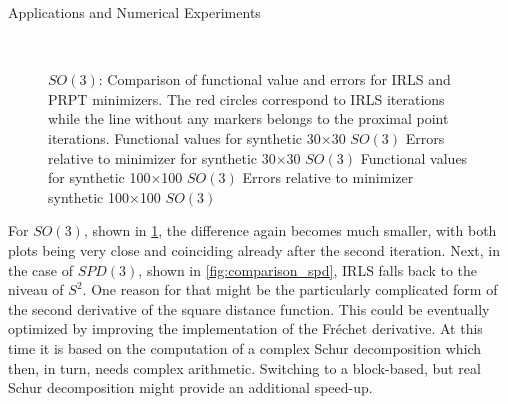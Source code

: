\begin{chapter}{Applications and Numerical Experiments}
\begin{figure}[h!]
{    }
    \\
    \caption[Comparison IRLS \& PRPT for Euclidean $SO(3)$]{$SO(3)$: Comparison of functional value and errors for IRLS and PRPT minimizers.
	The red circles correspond to IRLS iterations while the line without any markers belongs to the proximal point iterations.
	 Functional values for synthetic 30$\times$30 $SO(3)$
	  Errors relative to minimizer for synthetic 30$\times$30 $SO(3)$
	  Functional values for synthetic 100$\times$100 $SO(3)$
	  Errors relative to minimizer synthetic 100$\times$100 $SO(3)$
	\label{fig:comparison_son}
    }
\end{figure}

For $SO(3)$, shown in \ref{fig:comparison_son}, the difference again becomes much smaller, with both plots being very close and coinciding already after the second iteration. 
Next, in the case of $SPD(3)$, shown in \ref{fig:comparison_spd}, IRLS falls back to the niveau of $S^2$. One reason for that might be the particularly complicated form of the second
derivative of the square distance function. This could be eventually optimized by improving the implementation of the Fr\'{e}chet derivative. At this time it is based on
the computation of a complex Schur decomposition which then, in turn, needs complex arithmetic. Switching to a block-based, but real Schur decomposition might provide an additional speed-up.\\


\end{chapter}
